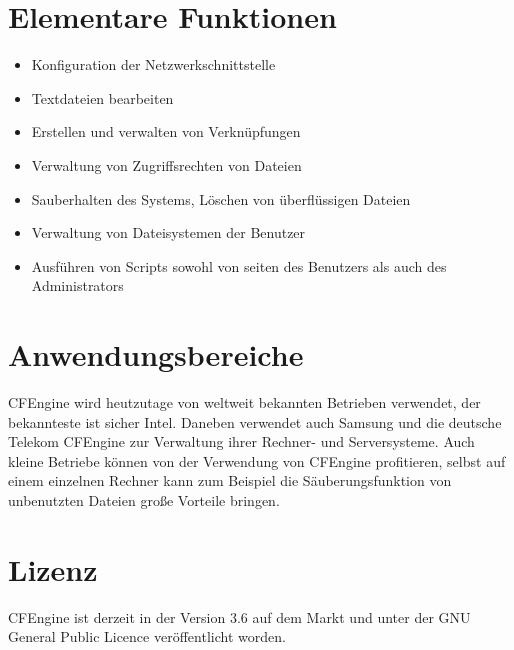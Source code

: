 \documentclass[12pt]{report}
\begin{document}
\section{Elementare Funktionen}
\begin{itemize}
	\item Konfiguration der Netzwerkschnittstelle
	\item Textdateien bearbeiten
	\item Erstellen und verwalten von Verknüpfungen
	\item Verwaltung von Zugriffsrechten von Dateien
	\item Sauberhalten des Systems, Löschen von überflüssigen Dateien
	\item Verwaltung von Dateisystemen der Benutzer
	\item Ausführen von Scripts sowohl von seiten des Benutzers als auch des Administrators
\end{itemize}
\section{Anwendungsbereiche}
CFEngine wird heutzutage von weltweit bekannten Betrieben verwendet, der bekannteste ist sicher Intel. Daneben verwendet auch Samsung und die deutsche Telekom CFEngine zur Verwaltung ihrer Rechner- und Serversysteme. Auch kleine Betriebe können von der Verwendung von CFEngine profitieren, selbst auf einem einzelnen Rechner kann zum Beispiel die Säuberungsfunktion von unbenutzten Dateien große Vorteile bringen.
\section{Lizenz}
CFEngine ist derzeit in der Version 3.6 auf dem Markt und unter der GNU General Public Licence veröffentlicht worden.
\end{document}
